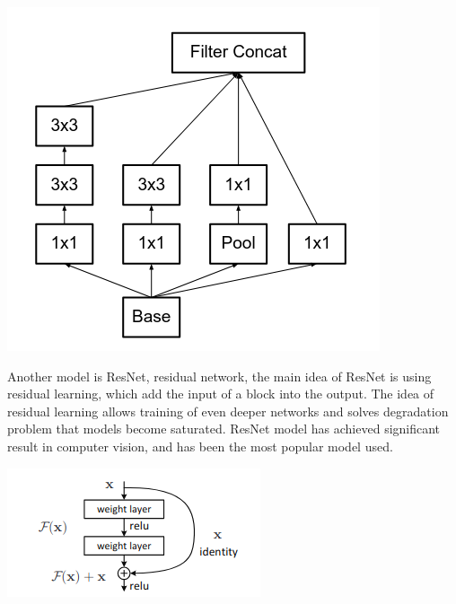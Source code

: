                     \begin{Figure}
                        \centering
                        \includegraphics[width=\linewidth]{Image/Inceptiion.png}
                    \end{Figure}

                    Another model is ResNet, residual network, the main idea of ResNet is using residual learning, which add the input of a block into the output. The idea of residual learning allows training of even deeper networks and solves degradation problem that models become saturated\cite{he2015deepresiduallearningimage}. ResNet model has achieved significant result in computer vision, and has been the most popular model used.

                    \begin{Figure}
                        \centering
                        \includegraphics[width=\linewidth]{Image/Residual.png}
                    \end{Figure}

